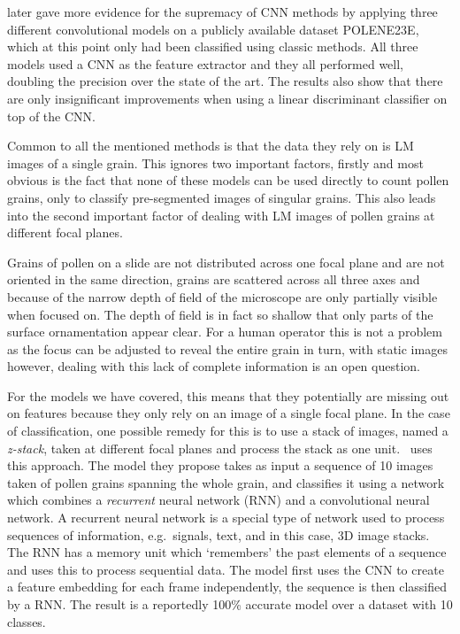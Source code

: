 {\cite{sevillano_improving_2018}} later gave more evidence for the supremacy of CNN methods by applying three different convolutional models on a publicly available dataset {POLENE23E}, which at this point only had been classified using classic methods.
All three models used a CNN as the feature extractor and they all performed well, doubling the precision over the state of the art.
The results also show that there are only insignificant improvements when using a linear discriminant classifier on top of the CNN\@.

Common to all the mentioned methods is that the data they rely on is LM images of a single grain.
This ignores two important factors, firstly and most obvious is the fact that none of these models can be used directly to count pollen grains, only to classify pre-segmented images of singular grains.
This also leads into the second important factor of dealing with LM images of pollen grains at different focal planes.

Grains of pollen on a slide are not distributed across one focal plane and are not oriented in the same direction, grains are scattered across all three axes and because of the narrow depth of field of the microscope are only partially visible when focused on.
The depth of field is in fact so shallow that only parts of the surface ornamentation appear clear.
For a human operator this is not a problem as the focus can be adjusted to reveal the entire grain in turn, with static images however, dealing with this lack of complete information is an open question.

For the models we have covered, this means that they potentially are missing out on features because they only rely on an image of a single focal plane.
In the case of classification, one possible remedy for this is to use a stack of images, named a \textit{z-stack}, taken at different focal planes and process the stack as one unit.\ \textcite{DaoodAndRibeiro_2018} uses this approach.
The model they propose takes as input a sequence of 10 images taken of pollen grains spanning the whole grain, and classifies it using a network which combines a \textit{recurrent} neural network (RNN) and a convolutional neural network.
A recurrent neural network is a special type of network used to process sequences of information, e.g.\ signals, text, and in this case, 3D image stacks.
The RNN has a memory unit which `remembers' the past elements of a sequence and uses this to process sequential data.
The model first uses the CNN to create a feature embedding for each frame independently, the sequence is then classified by a RNN\@.
The result is a reportedly 100\% accurate model over a dataset with 10 classes.

